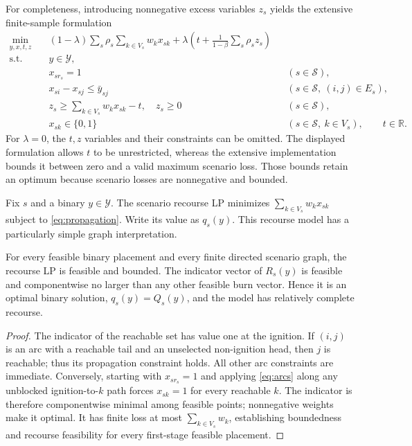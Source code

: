 For completeness, introducing nonnegative excess variables $z_s$ yields
the extensive finite-sample formulation
\begin{subequations}\label{eq:extensive}
\begin{align}
 \min_{y,x,t,z}\quad &(1-\lambda)
        \sum_s\rho_s\sum_{k\in V_s}w_kx_{sk}
       +\lambda\left(t+\frac{1}{1-\beta}
               \sum_s\rho_sz_s\right)\label{eq:ext-obj}\\
 \text{s.t.}\quad &y\in\mathcal Y,\label{eq:ext-budget}\\
 &x_{sr_s}=1 &&(s\in\mathcal S),\label{eq:ext-ignition}\\
 &x_{si}-x_{sj}\le\bar y_{sj}
       &&(s\in\mathcal S,\ (i,j)\in E_s),\label{eq:ext-graph}\\
 &z_s\ge\sum_{k\in V_s}w_kx_{sk}-t,
       \quad z_s\ge0 &&(s\in\mathcal S),\label{eq:ext-tail}\\
 &x_{sk}\in\{0,1\} &&(s\in\mathcal S,\ k\in V_s),
       \qquad t\in\mathbb R.\label{eq:ext-domains}
\end{align}
\end{subequations}
For $\lambda=0$, the $t,z$ variables and their constraints can be
omitted. The displayed formulation allows $t$ to be unrestricted, whereas
the extensive implementation bounds it between zero and a valid maximum
scenario loss. Those bounds retain an optimum because scenario losses are
nonnegative and bounded.

Fix $s$ and a binary $y\in\mathcal Y$. The scenario recourse LP minimizes
$\sum_{k\in V_s}w_kx_{sk}$ subject to
\eqref{eq:propagation}. Write its value as $q_s(y)$.
This recourse model has a particularly simple graph interpretation.

\begin{proposition}
\label{prop:recourse}
For every feasible binary placement and every finite directed scenario
graph, the recourse LP is feasible and bounded. The indicator vector of
$R_s(y)$ is feasible and componentwise no larger than any other feasible
burn vector. Hence it is an optimal binary solution,
$q_s(y)=Q_s(y)$, and the model has relatively complete recourse.
\end{proposition}
\begin{proof}
The indicator of the reachable set has value one at the ignition.
If $(i,j)$ is an arc with a reachable tail and an unselected non-ignition
head, then $j$ is reachable; thus its propagation constraint holds.
All other arc constraints are immediate. Conversely, starting with
$x_{sr_s}=1$ and applying \eqref{eq:arcs} along any unblocked
ignition-to-$k$ path forces $x_{sk}=1$ for every reachable $k$.
The indicator is therefore componentwise minimal among feasible points;
nonnegative weights make it optimal. It has finite loss at most
$\sum_{k\in V_s}w_k$, establishing boundedness and recourse feasibility
for every first-stage feasible placement.
\end{proof}

